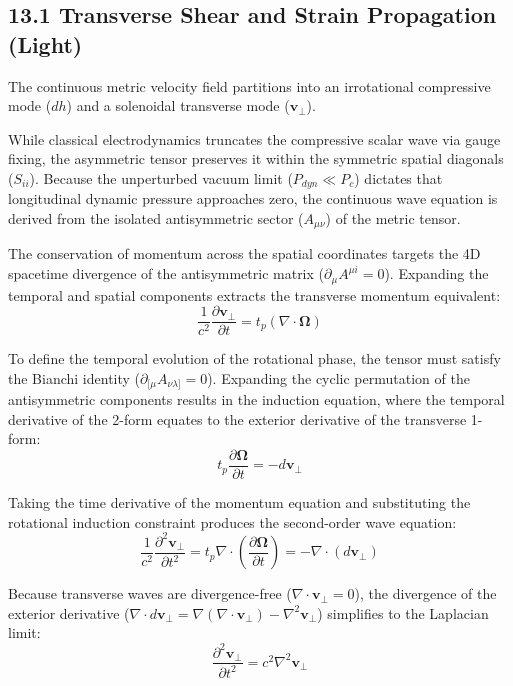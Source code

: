 \subsection*{13.1 Transverse Shear and Strain Propagation (Light)}
The continuous metric velocity field partitions into an irrotational compressive mode ($dh$) and a solenoidal transverse mode ($\mathbf{v}_\perp$). 

While classical electrodynamics truncates the compressive scalar wave via gauge fixing, the asymmetric tensor preserves it within the symmetric spatial diagonals ($S_{ii}$). 
Because the unperturbed vacuum limit ($P_{dyn} \ll P_c$) dictates that longitudinal dynamic pressure approaches zero, the continuous wave equation is derived from the isolated antisymmetric sector ($A_{\mu\nu}$) of the metric tensor. 

The conservation of momentum across the spatial coordinates targets the 4D spacetime divergence of the antisymmetric matrix ($\partial_\mu A^{\mu i} = 0$). Expanding the temporal and spatial components extracts the transverse momentum equivalent: 
\begin{equation}
    \frac{1}{c^2} \frac{\partial \mathbf{v}_\perp}{\partial t} = t_p (\nabla \cdot \boldsymbol{\Omega})
\end{equation}

To define the temporal evolution of the rotational phase, the tensor must satisfy the Bianchi identity ($\partial_{[\mu} A_{\nu\lambda]} = 0$). Expanding the cyclic permutation of the antisymmetric components results in the induction equation, where the temporal derivative of the 2-form equates to the exterior derivative of the transverse 1-form:
\begin{equation}
    t_p \frac{\partial \boldsymbol{\Omega}}{\partial t} = - d\mathbf{v}_\perp
\end{equation}

Taking the time derivative of the momentum equation and substituting the rotational induction constraint produces the second-order wave equation: 
\begin{equation}
    \frac{1}{c^2} \frac{\partial^2 \mathbf{v}_\perp}{\partial t^2} = t_p \nabla \cdot \left( \frac{\partial \boldsymbol{\Omega}}{\partial t} \right) = - \nabla \cdot (d\mathbf{v}_\perp)
\end{equation}

Because transverse waves are divergence-free ($\nabla \cdot \mathbf{v}_\perp = 0$), the divergence of the exterior derivative ($\nabla \cdot d\mathbf{v}_\perp = \nabla(\nabla \cdot \mathbf{v}_\perp) - \nabla^2 \mathbf{v}_\perp$) simplifies to the Laplacian limit: 
\begin{equation}
    \frac{\partial^2 \mathbf{v}_\perp}{\partial t^2} = c^2 \nabla^2 \mathbf{v}_\perp
\end{equation}

